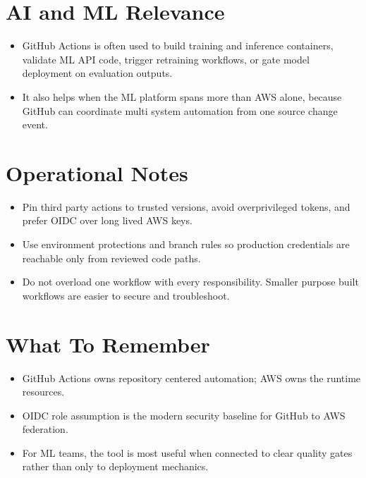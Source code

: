 \documentclass[10pt,twocolumn]{article}
\begin{document}
\section*{AI and ML Relevance}
\begin{itemize}
\item GitHub Actions is often used to build training and inference containers, validate ML API code, trigger retraining workflows, or gate model deployment on evaluation outputs.
\item It also helps when the ML platform spans more than AWS alone, because GitHub can coordinate multi system automation from one source change event.
\end{itemize}

\section*{Operational Notes}
\begin{itemize}
\item Pin third party actions to trusted versions, avoid overprivileged tokens, and prefer OIDC over long lived AWS keys.
\item Use environment protections and branch rules so production credentials are reachable only from reviewed code paths.
\item Do not overload one workflow with every responsibility. Smaller purpose built workflows are easier to secure and troubleshoot.
\end{itemize}

\section*{What To Remember}
\begin{itemize}
\item GitHub Actions owns repository centered automation; AWS owns the runtime resources.
\item OIDC role assumption is the modern security baseline for GitHub to AWS federation.
\item For ML teams, the tool is most useful when connected to clear quality gates rather than only to deployment mechanics.
\end{itemize}
\end{document}
